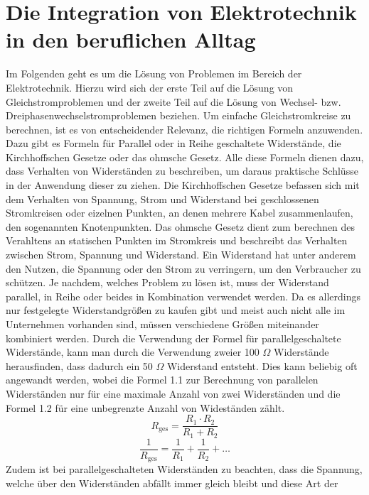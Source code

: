 \section{Die Integration von Elektrotechnik in den beruflichen Alltag}

Im Folgenden geht es um die Lösung von Problemen im Bereich der Elektrotechnik. Hierzu wird sich der erste Teil auf die Lösung von Gleichstromproblemen und der 
zweite Teil auf die Lösung von Wechsel- bzw. Dreiphasenwechselstromproblemen beziehen. Um einfache Gleichstromkreise zu berechnen, ist es von entscheidender Relevanz, 
die richtigen Formeln anzuwenden. Dazu gibt es \zB Formeln für Parallel oder in Reihe geschaltete Widerstände, die Kirchhoffschen Gesetze oder das ohmsche 
Gesetz. Alle diese Formeln dienen dazu, dass Verhalten von Widerständen zu beschreiben, um daraus praktische Schlüsse in der Anwendung dieser zu ziehen. 
Die Kirchhoffschen Gesetze befassen sich mit dem Verhalten von Spannung, Strom und Widerstand bei geschlossenen Stromkreisen oder eizelnen Punkten, an denen 
mehrere Kabel zusammenlaufen, den sogenannten Knotenpunkten. Das ohmsche Gesetz dient zum berechnen des Verahltens an statischen Punkten im Stromkreis und 
beschreibt das Verhalten zwischen Strom, Spannung und Widerstand. Ein Widerstand hat unter anderem den Nutzen, die Spannung oder den Strom zu verringern, um 
den Verbraucher zu schützen. Je nachdem, welches Problem zu lösen ist, muss der Widerstand parallel, in Reihe oder beides in Kombination verwendet werden. 
Da es allerdings nur festgelegte Widerstandgrößen zu kaufen gibt und meist auch nicht alle im Unternehmen vorhanden sind, müssen verschiedene Größen miteinander
kombiniert werden. Durch die Verwendung der Formel für parallelgeschaltete Widerstände, kann man \zB durch die Verwendung zweier 100 $\Omega$ Widerstände 
herausfinden, dass dadurch ein 50 $\Omega$ Widerstand entsteht. 
Dies kann beliebig oft angewandt werden, wobei die Formel 1.1 zur Berechnung von parallelen Widerständen nur für eine maximale Anzahl von zwei 
Widerständen und die Formel 1.2 für eine unbegrenzte Anzahl von Wideständen zählt.
\begin{equation}
R_{\text{ges}}=\frac{R_1 \cdot R_2}{R_1+R_2}
\label{eqn:Parallelschaltung von 2 Widerständen}
\end{equation}
\begin{equation}
\frac{1}{R_{\text{ges}}}=\frac{1}{R_1}+\frac{1}{R_2}+\dots
\label{eqn:Parallelschaltung von mehreren Widerständen}
\end{equation}
Zudem ist bei parallelgeschalteten Widerständen zu beachten, dass die Spannung, welche über den Widerständen abfällt immer gleich bleibt und diese Art der 
